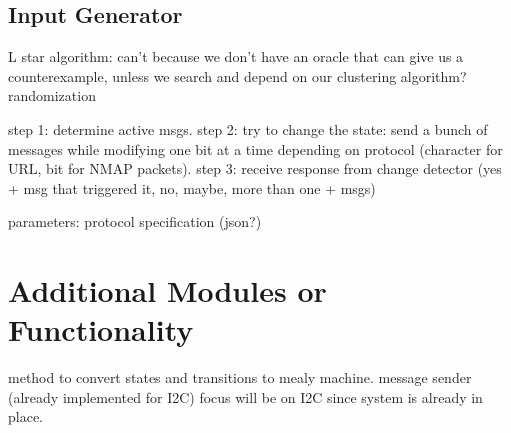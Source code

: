 \documentclass[12pt, a4paper]{article}
\begin{document}
\subsection*{Input Generator}
L star algorithm: can't because we don't have an oracle that can give us a counterexample, unless we search and depend on our clustering algorithm?
randomization

step 1: determine active msgs.
step 2: try to change the state: send a bunch of messages while modifying one bit at a time depending on protocol (character for URL, bit for NMAP packets).
step 3: receive response from change detector (yes + msg that triggered it, no, maybe, more than one + msgs)

parameters: protocol specification (json?)

\section*{Additional Modules or Functionality}
method to convert states and transitions to mealy machine.
message sender (already implemented for I2C)
focus will be on I2C since system is already in place.
\end{document}
